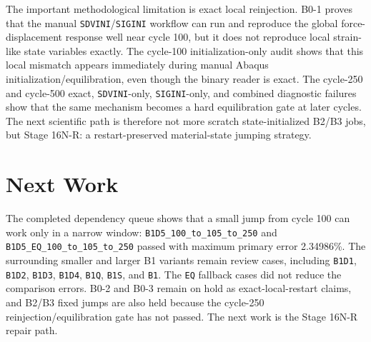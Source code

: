 \documentclass[11pt,a4paper]{article}
\newcommand{\code}[1]{\texttt{#1}}
\begin{document}
The important methodological limitation is exact local reinjection. B0-1 proves that the manual \code{SDVINI}/\code{SIGINI} workflow can run and reproduce the global force-displacement response well near cycle 100, but it does not reproduce local strain-like state variables exactly. The cycle-100 initialization-only audit shows that this local mismatch appears immediately during manual Abaqus initialization/equilibration, even though the binary reader is exact. The cycle-250 and cycle-500 exact, \code{SDVINI}-only, \code{SIGINI}-only, and combined diagnostic failures show that the same mechanism becomes a hard equilibration gate at later cycles. The next scientific path is therefore not more scratch state-initialized B2/B3 jobs, but Stage 16N-R: a restart-preserved material-state jumping strategy.

\section{Next Work}

The completed dependency queue shows that a small jump from cycle 100 can work only in a narrow window: \code{B1D5\_100\_to\_105\_to\_250} and \code{B1D5\_EQ\_100\_to\_105\_to\_250} passed with maximum primary error 2.34986\%. The surrounding smaller and larger B1 variants remain review cases, including \code{B1D1}, \code{B1D2}, \code{B1D3}, \code{B1D4}, \code{B1Q}, \code{B1S}, and \code{B1}. The \code{EQ} fallback cases did not reduce the comparison errors. B0-2 and B0-3 remain on hold as exact-local-restart claims, and B2/B3 fixed jumps are also held because the cycle-250 reinjection/equilibration gate has not passed. The next work is the Stage 16N-R repair path.
\end{document}
